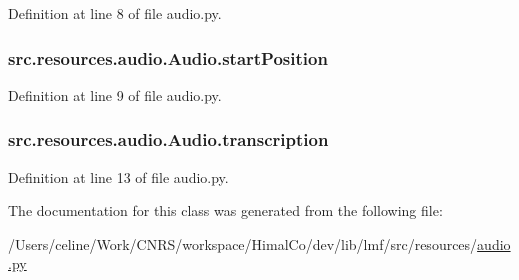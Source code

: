 Definition at line 8 of file audio.\+py.

\hypertarget{classsrc_1_1resources_1_1audio_1_1_audio_a8d782bb99c64c395286d7f71a8c2ebf8}{
\subsubsection[{start\+Position}]{\setlength{\rightskip}{0pt plus 5cm}src.\+resources.\+audio.\+Audio.\+start\+Position}}\label{classsrc_1_1resources_1_1audio_1_1_audio_a8d782bb99c64c395286d7f71a8c2ebf8}


Definition at line 9 of file audio.\+py.

\hypertarget{classsrc_1_1resources_1_1audio_1_1_audio_aef44fd13d82cd3f79150c76b9b6f4c3e}{
\subsubsection[{transcription}]{\setlength{\rightskip}{0pt plus 5cm}src.\+resources.\+audio.\+Audio.\+transcription}}\label{classsrc_1_1resources_1_1audio_1_1_audio_aef44fd13d82cd3f79150c76b9b6f4c3e}


Definition at line 13 of file audio.\+py.



The documentation for this class was generated from the following file\+:\begin{DoxyCompactItemize}
\item 
/\+Users/celine/\+Work/\+C\+N\+R\+S/workspace/\+Himal\+Co/dev/lib/lmf/src/resources/\hyperlink{audio_8py}{audio.\+py}\end{DoxyCompactItemize}
